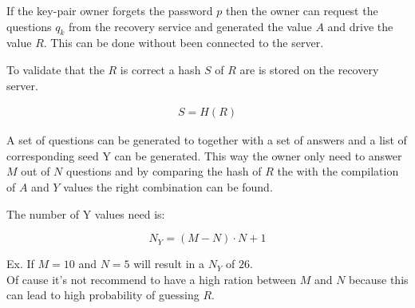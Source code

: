 If the key-pair owner forgets the password $p$ then the owner can request the questions $q_k$ from the recovery service and generated the value $A$ and drive the value $R$. This can be done without been connected to the server.

To validate that the $R$ is correct a hash $S$ of $R$ are is stored on the recovery server.

 \begin{align}
  S = H(R)
 \end{align}

A set of questions can be generated to together with a set of answers and a list of corresponding seed Y can be generated. This way the owner only need to answer $M$ out of $N$ questions and by comparing the hash of $R$ the with the compilation of $A$ and $Y$ values the right combination can be found.

The number of Y values need is:

\begin{equation}
  N_Y = (M-N) \cdot N + 1
\end{equation}

Ex. If $M=10$ and $N=5$ will result in a $N_Y$ of $26$.\\


Of cause it's not recommend to have a high ration between $M$ and $N$ because this can lead to high probability of guessing $R$.




